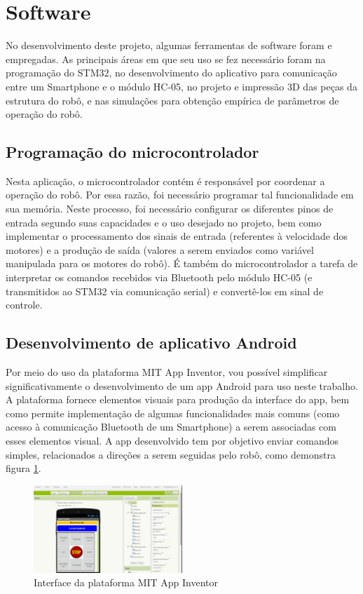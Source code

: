 
\section{Software}
No desenvolvimento deste projeto, algumas ferramentas de software foram e empregadas. As principais áreas em que seu uso
se fez necessário foram na programação do STM32, no desenvolvimento do aplicativo para comunicação entre um Smartphone e
o módulo HC-05, no projeto e impressão 3D das peças da estrutura do robô, e nas simulações para obtenção empírica de
parâmetros de operação do robô.

\subsection{Programação do microcontrolador}
Nesta aplicação, o microcontrolador contém é responsável por coordenar a operação do robô. Por essa razão, foi
necessário programar tal funcionalidade em sua memória. Neste processo, foi necessário configurar os diferentes pinos de
entrada segundo suas capacidades e o uso desejado no projeto, bem como implementar o processamento dos sinais de entrada
(referentes à velocidade dos motores) e a produção de saída (valores a serem enviados como variável manipulada para os
motores do robô). É também do microcontrolador a tarefa de interpretar os comandos recebidos via Bluetooth pelo módulo 
HC-05 (e transmitidos ao STM32 via comunicação serial) e convertê-los em sinal de controle.

\subsection{Desenvolvimento de aplicativo Android}
Por meio do uso da plataforma MIT App Inventor, vou possível simplificar significativamente o desenvolvimento de um app
Android para uso neste trabalho. A plataforma fornece elementos visuais para produção da interface do app, bem como 
permite implementação de algumas funcionalidades mais comuns (como acesso à comunicação Bluetooth de um Smartphone) a 
serem associadas com esses elementos visual. A app desenvolvido tem por objetivo enviar comandos simples, relacionados
a direções a serem seguidas pelo robô, como demonstra figura \ref{fig:mit_app_inventor}.

\begin{figure}[htb]
	\centering
	\includegraphics[width=0.5\textwidth]{figures/mit_app_inventor.png}
	\caption{Interface da plataforma MIT App Inventor}
	\label{fig:mit_app_inventor}
\end{figure}